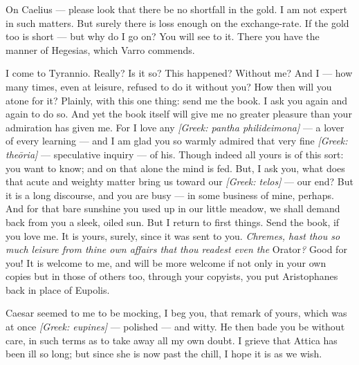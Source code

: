 

 On Caelius --- please look that there be no shortfall in the gold. I am not expert in such matters. But surely there is loss enough on the exchange-rate. If the gold too is short --- but why do I go on? You will see to it. There you have the manner of Hegesias, which Varro commends.

 I come to Tyrannio. Really? Is it so? This happened? Without me? And I --- how many times, even at leisure, refused to do it without you? How then will you atone for it? Plainly, with this one thing: send me the book. I ask you again and again to do so. And yet the book itself will give me no greater pleasure than your admiration has given me. For I love any \textit{[Greek: pantha philideimona]} --- a lover of every learning --- and I am glad you so warmly admired that very fine \textit{[Greek: the\=oria]} --- speculative inquiry --- of his. Though indeed all yours is of this sort: you want to know; and on that alone the mind is fed. But, I ask you, what does that acute and weighty matter bring us toward our \textit{[Greek: telos]} --- our end? But it is a long discourse, and you are busy --- in some business of mine, perhaps. And for that bare sunshine you used up in our little meadow, we shall demand back from you a sleek, oiled sun. But I return to first things. Send the book, if you love me. It is yours, surely, since it was sent to you. \textit{Chremes, hast thou so much leisure from thine own affairs that thou readest even the} Orator\textit{?} Good for you! It is welcome to me, and will be more welcome if not only in your own copies but in those of others too, through your copyists, you put Aristophanes back in place of Eupolis.

 Caesar seemed to me to be mocking, I beg you, that remark of yours, which was at once \textit{[Greek: eupines]} --- polished --- and witty. He then bade you be without care, in such terms as to take away all my own doubt. I grieve that Attica has been ill so long; but since she is now past the chill, I hope it is as we wish.
